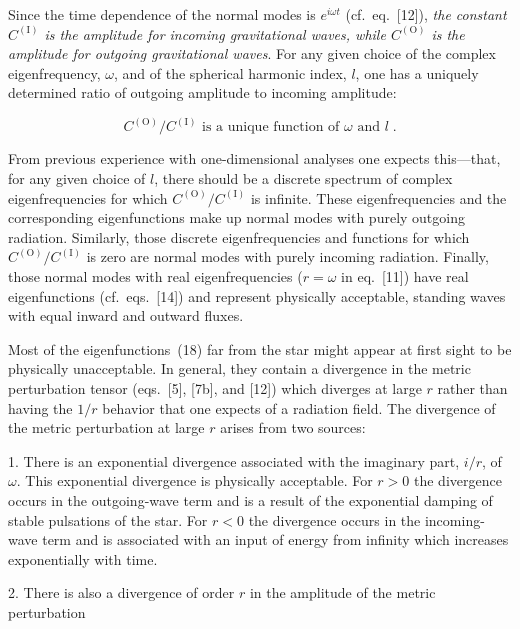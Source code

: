 Since the time dependence of the normal modes is $e^{i\omega t}$ (cf.\ eq.~[12]), \textit{the constant $C^{(\mathrm{I})}$
is the amplitude for incoming gravitational waves, while $C^{(\mathrm{O})}$ is the amplitude for outgoing
gravitational waves}. For any given choice of the complex eigenfrequency, $\omega$, and of the
spherical harmonic index, $l$, one has a uniquely determined ratio of outgoing amplitude
to incoming amplitude:

\begin{equation}
C^{(\mathrm{O})}/C^{(\mathrm{I})} \text{ is a unique function of } \omega \text{ and } l \;.
\label{eq:20}
\tag{20}
\end{equation}

From previous experience with one-dimensional analyses one expects this---that, for
any given choice of $l$, there should be a discrete spectrum of complex eigenfrequencies
for which $C^{(\mathrm{O})}/C^{(\mathrm{I})}$ is infinite. These eigenfrequencies and the corresponding eigenfunctions make up normal modes with purely outgoing radiation. Similarly, those discrete
eigenfrequencies and functions for which $C^{(\mathrm{O})}/C^{(\mathrm{I})}$ is zero are normal modes with
purely incoming radiation. Finally, those normal modes with real eigenfrequencies
($r = \omega$ in eq.~[11]) have real eigenfunctions (cf.\ eqs.~[14]) and represent physically
acceptable, standing waves with equal inward and outward fluxes.

Most of the eigenfunctions~(18) far from the star might appear at first sight to be
physically unacceptable. In general, they contain a divergence in the metric perturbation
tensor (eqs.~[5], [7b], and [12]) which diverges at large $r$ rather than having the $1/r$
behavior that one expects of a radiation field. The divergence of the metric perturbation
at large $r$ arises from two sources:

1. There is an exponential divergence associated with the imaginary part, $i/r$, of $\omega$.
This exponential divergence is physically acceptable. For $r > 0$ the divergence occurs in the outgoing-wave term and is a result of the exponential damping of stable pulsations of the star.
For $r < 0$ the divergence occurs in the incoming-wave term and is associated with an
input of energy from infinity which increases exponentially with time.

2. There is also a divergence of order $r$ in the amplitude of the metric perturbation
